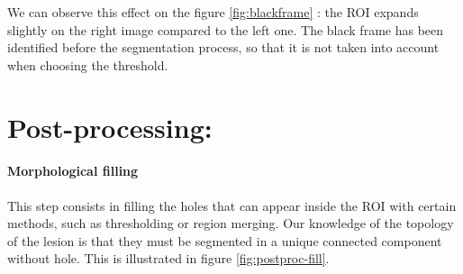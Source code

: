 \documentclass[a4paper,10pt]{article}
\begin{document}
We can observe this effect on the figure \ref{fig:blackframe} : the ROI expands slightly on the right image compared to the left one. The black frame has been identified before the segmentation process, so that it is not taken into account when choosing the threshold.




\section{Post-processing:}
\paragraph{Morphological filling} This step consists in filling the holes that can appear inside the ROI with certain methods, such as thresholding or region merging. Our knowledge of the topology of the lesion is that they must be segmented in a unique connected component without hole. This is illustrated in figure \ref{fig:postproc-fill}.
\end{document}
